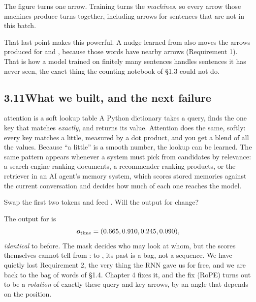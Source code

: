 \begin{breaks}
The figure turns one arrow. Training turns the \emph{machines}, so every arrow those machines produce turns
together, including arrows for sentences that are not in this batch.
\end{breaks}

That last point makes this powerful. A nudge learned from  also moves the arrows produced for
 and , because those words have nearby arrows (Requirement 1). That is how
a model trained on finitely many sentences handles sentences it has never seen, the exact thing the counting
notebook of \S1.3 could not do.


\subsection*{3.11\quad What we built, and the next failure}

\begin{principle}{attention is a soft lookup table}
A Python dictionary takes a query, finds the one key that matches \emph{exactly}, and returns its value. Attention
does the same, softly: every key matches a little, measured by a dot product, and you get a blend of all the values.
Because ``a little'' is a smooth number, the lookup can be learned. The same pattern appears whenever a system must
pick from candidates by relevance: a search engine ranking documents, a recommender ranking products, or the
retriever in an AI agent's memory system, which scores stored memories against the current conversation and decides
how much of each one reaches the model.
\end{principle}

\Predict Swap the first two tokens and feed . Will the output for  change?

The output for  is
\[ \bm{o}_{\text{time}} = (0.665, 0.910, 0.245, 0.090), \]
\emph{identical} to before. The mask decides who may look at whom, but the scores themselves cannot tell  from : to , its past is a bag, not a sequence. We have quietly lost Requirement 2, the
very thing the RNN gave us for free, and we are back to the bag of words of \S1.4. Chapter 4 fixes it, and the fix
(RoPE) turns out to be a \emph{rotation} of exactly these query and key arrows, by an angle that depends on the
position.

